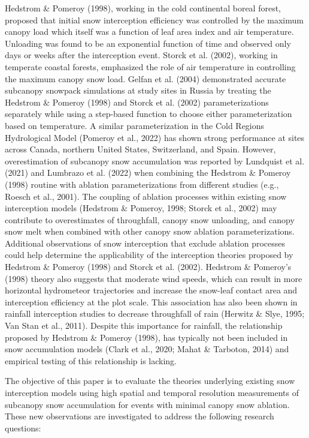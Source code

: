 \documentclass[
  letterpaper,
  DIV=11,
  numbers=noendperiod]{scrartcl}
\begin{document}
Hedstrom \& Pomeroy (1998), working in the cold continental boreal
forest, proposed that initial snow interception efficiency was
controlled by the maximum canopy load which itself was a function of
leaf area index and air temperature. Unloading was found to be an
exponential function of time and observed only days or weeks after the
interception event. Storck et al. (2002), working in temperate coastal
forests, emphasized the role of air temperature in controlling the
maximum canopy snow load. Gelfan et al. (2004) demonstrated accurate
subcanopy snowpack simulations at study sites in Russia by treating the
Hedstrom \& Pomeroy (1998) and Storck et al. (2002) parameterizations
separately while using a step-based function to choose either
parameterization based on temperature. A similar parameterization in the
Cold Regions Hydrological Model (Pomeroy et al., 2022) has shown strong
performance at sites across Canada, northern United States, Switzerland,
and Spain. However, overestimation of subcanopy snow accumulation was
reported by Lundquist et al. (2021) and Lumbrazo et al. (2022) when
combining the Hedstrom \& Pomeroy (1998) routine with ablation
parameterizations from different studies (e.g., Roesch et al., 2001).
The coupling of ablation processes within existing snow interception
models (Hedstrom \& Pomeroy, 1998; Storck et al., 2002) may contribute
to overestimates of throughfall, canopy snow unloading, and canopy snow
melt when combined with other canopy snow ablation parameterizations.
Additional observations of snow interception that exclude ablation
processes could help determine the applicability of the interception
theories proposed by Hedstrom \& Pomeroy (1998) and Storck et al.
(2002). Hedstrom \& Pomeroy's (1998) theory also suggests that moderate
wind speeds, which can result in more horizontal hydrometeor
trajectories and increase the snow-leaf contact area and interception
efficiency at the plot scale. This association has also been shown in
rainfall interception studies to decrease throughfall of rain (Herwitz
\& Slye, 1995; Van Stan et al., 2011). Despite this importance for
rainfall, the relationship proposed by Hedstrom \& Pomeroy (1998), has
typically not been included in snow accumulation models (Clark et al.,
2020; Mahat \& Tarboton, 2014) and empirical testing of this
relationship is lacking.

The objective of this paper is to evaluate the theories underlying
existing snow interception models using high spatial and temporal
resolution measurements of subcanopy snow accumulation for events with
minimal canopy snow ablation. These new observations are investigated to
address the following research questions:
\end{document}
